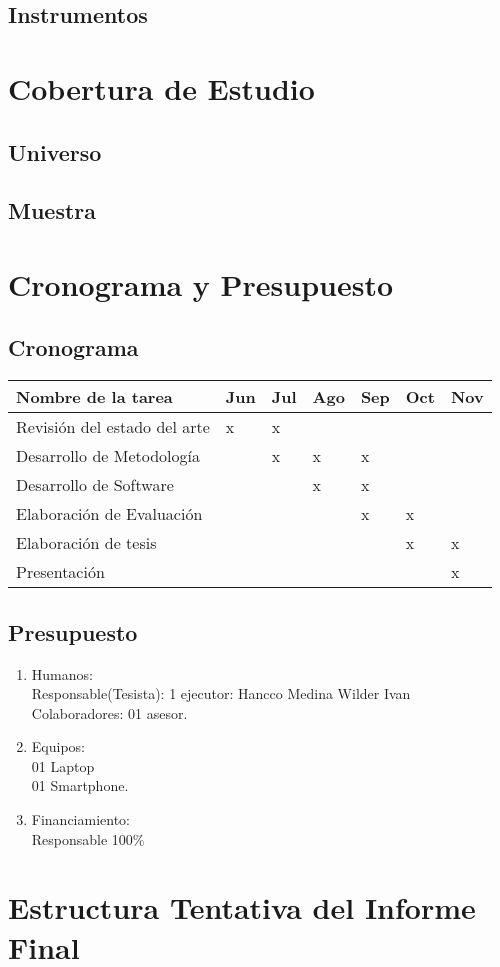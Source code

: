 \subsection{Instrumentos}

\section{Cobertura de Estudio}
\subsection{Universo}
\subsection{Muestra}

\section{Cronograma y Presupuesto}
\subsection{Cronograma}

\begin{table}[H]
\raggedright
\begin{tabularx}{\linewidth}{@{}|p{5cm}|X|X|X|X|X|X|@{}}
\hline
Nombre de la tarea & Jun & Jul & Ago & Sep & Oct& Nov   \\ \hline
Revisión del estado del arte    & x & x &   &   &   &   \\ \hline
Desarrollo de Metodología       &   & x & x & x &   &   \\ \hline
Desarrollo de Software          &   &   & x & x &   &   \\ \hline
Elaboración de Evaluación       &   &   &   & x & x &   \\ \hline
Elaboración de tesis            &   &   &   &   & x & x \\ \hline
Presentación                    &   &   &   &   &   & x \\ \hline
\end{tabularx}
\end{table}


\subsection{Presupuesto}
\begin{enumerate}
    \item Humanos:\\Responsable(Tesista): 1 ejecutor: Hancco Medina Wilder Ivan\\
    Colaboradores: 01 asesor.
    \item Equipos:\\01 Laptop\\01 Smartphone.
    \item Financiamiento:\\Responsable 100\%
\end{enumerate}


\section{Estructura Tentativa del Informe Final}





